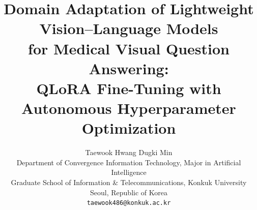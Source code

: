 \documentclass[11pt]{article}
\title{\bfseries Domain Adaptation of Lightweight Vision--Language Models\\
for Medical Visual Question Answering:\\
QLoRA Fine-Tuning with Autonomous Hyperparameter Optimization}
\author{%
  Taewook Hwang \qquad Dugki Min\\[2pt]
  Department of Convergence Information Technology, Major in Artificial Intelligence\\
  Graduate School of Information \& Telecommunications, Konkuk University\\
  Seoul, Republic of Korea\\[2pt]
  \texttt{taewook486@konkuk.ac.kr}
}
\date{}
\begin{document}
\maketitle

\begin{abstract}

\end{abstract}











\appendix

\end{document}
